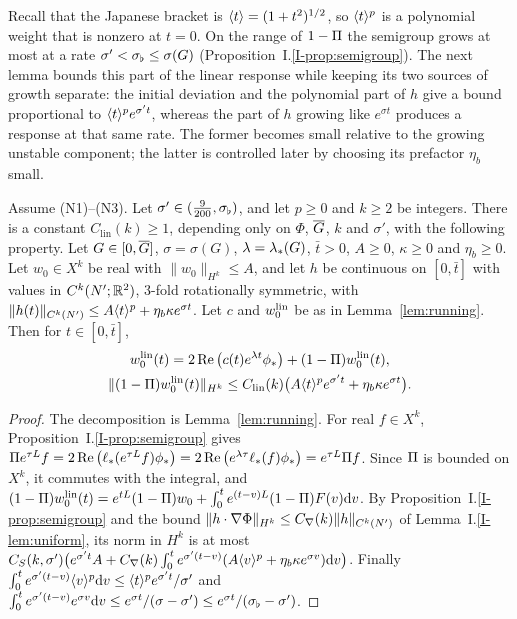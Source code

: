 Recall that the Japanese bracket is $\langle t\rangle=(1+t^2)^{1/2}$, so
$\langle t\rangle^p$ is a polynomial weight that is nonzero at $t=0$.
On the range of $1-\Pi$ the semigroup grows at most at a rate
$\sigma'<\sigma_\flat\le\sigma(G)$ (Proposition~I.\ref{I-prop:semigroup}).
The next lemma bounds this part of the linear response while keeping its
two sources of growth separate: the initial deviation and the polynomial
part of $h$ give a bound proportional to $\langle t\rangle^pe^{\sigma't}$, whereas
the part of $h$ growing like $e^{\sigma t}$ produces a response at that same
rate. The former becomes small relative to the growing unstable component;
the latter is controlled later by choosing its prefactor $\eta_b$ small.

\begin{lemma}
\label{lem:linear-part}
Assume \textup{(N1)}--\textup{(N3)}. Let $\sigma'\in(\frac9{200},\sigma_\flat)$, and let
$p\ge0$ and $k\ge2$ be integers. There is a constant $C_{\mathrm{lin}}(k)\ge1$,
depending only on $\Phi$, $\overline{G}$, $k$ and $\sigma'$, with the following property. Let $G\in[0,\overline{G}]$,
$\sigma=\sigma(G)$, $\lambda=\lambda_*(G)$, $\bar t>0$, $A\ge0$, $\kappa\ge0$ and
$\eta_b\ge0$. Let $w_0\in X^k$ be real with $\|w_0\|_{H^k}\le A$, and let $h$ be
continuous on $[0,\bar t]$ with values in $C^k(N';\mathbb{R}^2)$, $3$-fold rotationally symmetric, with
$\|h(t)\|_{C^k(N')}\le A\langle t\rangle^p+\eta_b\kappa e^{\sigma t}$. Let $c$ and $w^{\mathrm{lin}}_0$ be as
in Lemma~\ref{lem:running}. Then for $t\in[0,\bar t]$,
\[
\begin{gathered}
w^{\mathrm{lin}}_0(t)=2\Re\big(c(t)e^{\lambda t}\phi_*\big)+(1-\Pi)w^{\mathrm{lin}}_0(t),\\
\|(1-\Pi)w^{\mathrm{lin}}_0(t)\|_{H^k}\le C_{\mathrm{lin}}(k)\big(A\langle t\rangle^pe^{\sigma't}+\eta_b\kappa e^{\sigma t}\big).
\end{gathered}
\]
\end{lemma}
\begin{proof}
The decomposition is Lemma~\ref{lem:running}. For real $f\in X^k$,
Proposition~I.\ref{I-prop:semigroup} gives
$\Pi e^{\tau L}f=2\Re\big(\ell_*(e^{\tau L}f)\phi_*\big)=2\Re\big(e^{\lambda\tau}\ell_*(f)\phi_*\big)=e^{\tau L}\Pi f$.
Since $\Pi$ is bounded on $X^k$, it commutes with the integral, and
$(1-\Pi)w^{\mathrm{lin}}_0(t)=e^{tL}(1-\Pi)w_0+\int_0^te^{(t-v)L}(1-\Pi)F(v)\dd v$.
By Proposition~I.\ref{I-prop:semigroup} and the bound
$\|h\cdot\nabla\Phi\|_{H^k}\le C_{\nabla}(k)\|h\|_{C^k(N')}$ of Lemma~I.\ref{I-lem:uniform}, its
norm in $H^k$ is at most
$C_S(k,\sigma')\big(e^{\sigma't}A+C_{\nabla}(k)\int_0^te^{\sigma'(t-v)}(A\langle v\rangle^p+\eta_b\kappa e^{\sigma v})\dd v\big)$.
Finally
$\int_0^te^{\sigma'(t-v)}\langle v\rangle^p\dd v\le\langle t\rangle^pe^{\sigma't}/\sigma'$ and
$\int_0^te^{\sigma'(t-v)}e^{\sigma v}\dd v\le e^{\sigma t}/(\sigma-\sigma')\le e^{\sigma t}/(\sigma_\flat-\sigma')$.
\end{proof}


